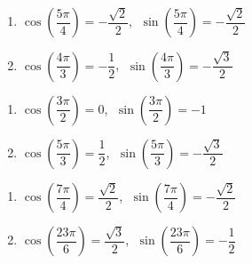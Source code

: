 \documentclass{ximera}
\begin{document}
\begin{multicols}{2}

\begin{enumerate}

\setcounter{enumi}{\value{HW}}

\item $\cos \left(\dfrac{5\pi}{4} \right) = -\dfrac{\sqrt{2}}{2}$, $\; \sin \left(\dfrac{5\pi}{4} \right) = -\dfrac{\sqrt{2}}{2}$

\item $\cos\left(\dfrac{4\pi}{3}\right) = -\dfrac{1}{2}$, $\; \sin \left(\dfrac{4\pi}{3}\right) = -\dfrac{\sqrt{3}}{2}$

\setcounter{HW}{\value{enumi}}

\end{enumerate}

\end{multicols}

\begin{multicols}{2}

\begin{enumerate}

\setcounter{enumi}{\value{HW}}

\item $\cos \left(\dfrac{3\pi}{2}\right) = 0$, $\; \sin \left(\dfrac{3\pi}{2}\right) = -1$

\item $\cos\left(\dfrac{5\pi}{3}\right) = \dfrac{1}{2}$, $\; \sin \left(\dfrac{5\pi}{3}\right) = -\dfrac{\sqrt{3}}{2}$

\setcounter{HW}{\value{enumi}}

\end{enumerate}

\end{multicols}

\begin{multicols}{2}

\begin{enumerate}

\setcounter{enumi}{\value{HW}}

\item $\cos \left(\dfrac{7\pi}{4} \right) = \dfrac{\sqrt{2}}{2}$, $\; \sin \left(\dfrac{7\pi}{4} \right) = -\dfrac{\sqrt{2}}{2}$

\item $\cos\left(\dfrac{23\pi}{6}\right) = \dfrac{\sqrt{3}}{2}$, $\; \sin\left(\dfrac{23\pi}{6}\right) = -\dfrac{1}{2}$

\setcounter{HW}{\value{enumi}}

\end{enumerate}

\end{multicols}
\end{document}

